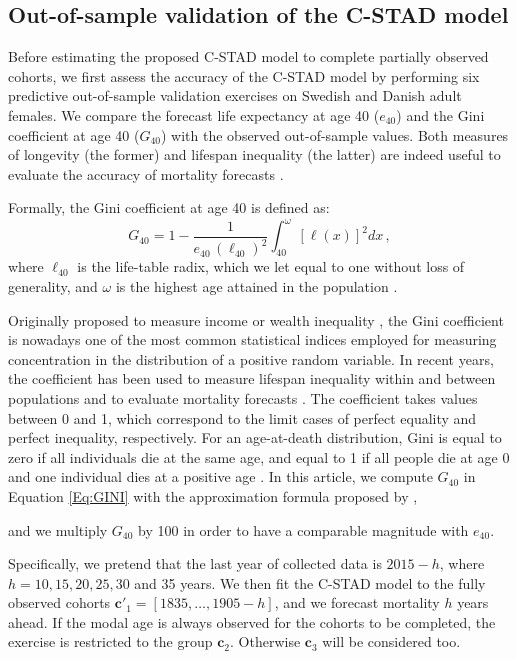 \documentclass[11pt, a4paper]{article}
\begin{document}
\subsection{Out-of-sample validation of the C-STAD model}
\label{Subsec:Out-of-sample}
Before estimating the proposed C-STAD model to complete partially observed cohorts, we first assess the accuracy of the C-STAD model by performing six predictive out-of-sample validation exercises on Swedish and Danish adult females. We compare the forecast life expectancy at age 40 ($e_{40}$) and the Gini coefficient at age 40 ($G_{40}$) with the observed out-of-sample values. Both measures of longevity (the former) and lifespan inequality (the latter) are indeed useful to evaluate the accuracy of mortality forecasts \citep{bohk2017lifespan}. {\color{red}Formally, the Gini coefficient at age 40 is defined as:
%
\begin{equation}\label{Eq:GINI}
G_{40} = 1 - \frac{1}{e_{40}\,\left(\ell_{40}\right)^2} \int_{40}^{\omega} \left[\ell(x)\right]^2 dx \, ,
\end{equation}
%
where $\ell_{40}$ is the life-table radix, which we let equal to one without loss of generality, and $\omega$ is the highest age attained in the population \citep{hanada1983formula,shkolnikov2003gini}.

Originally proposed to measure income or wealth inequality \citep{gini1912variabilita,gini1914sulla}, the Gini coefficient is nowadays one of the most common statistical indices employed for measuring concentration in the distribution of a positive random variable. In recent years, the coefficient has been used to measure lifespan inequality within and between populations \cite[see, e.g.,][]{shkolnikov2003gini,smits2009length,van2013perturbation,gigliarano2017longevity} and to evaluate mortality forecasts \citep{diaz2018mortality,basellini2019modelling}. The coefficient takes values between 0 and 1, which correspond to the limit cases of perfect equality and perfect inequality, respectively. For an age-at-death distribution, Gini is equal to zero if all individuals die at the same age, and equal to 1 if all people die at age 0 and one individual dies at a positive age \citep{shkolnikov2003gini}. In this article, we compute $G_{40}$ in Equation \eqref{Eq:GINI} with the approximation formula proposed by \cite{shkolnikov2003gini},} and we multiply $G_{40}$ by 100 in order to have a comparable magnitude with $e_{40}$.

Specifically, we pretend that the last year of collected data is $2015 - h$, where $h=10,15,20,25,30$ and 35 years. We then fit the C-STAD model to the fully observed cohorts {\color{red}$\bm{c}'_1=\left[1835,\dots,1905-h\right]$}, and we forecast mortality $h$ years ahead. {\color{red} If the modal age is always observed for the cohorts to be completed, the exercise is restricted to the group $\bm{c}_{2}$. Otherwise $\bm{c}_{3}$ will be considered too.} 
\end{document}

